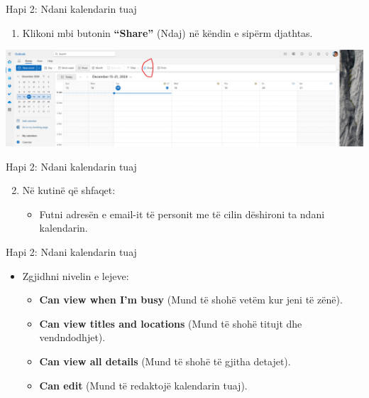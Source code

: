 \documentclass[
  ignorenonframetext,
]{beamer}
\providecommand{\tightlist}{%
  \setlength{\itemsep}{0pt}\setlength{\parskip}{0pt}}
\begin{document}
\begin{frame}{Hapi 2: Ndani kalendarin tuaj}
\label{hapi-2-ndani-kalendarin-tuaj}
\begin{enumerate}
\tightlist
\item
  Klikoni mbi butonin \textbf{``Share''} (Ndaj) në këndin e sipërm
  djathtas.
\end{enumerate}

\includegraphics{./images/outlook28.png}
\end{frame}

\begin{frame}{Hapi 2: Ndani kalendarin tuaj}
\label{hapi-2-ndani-kalendarin-tuaj-1}
\begin{enumerate}
\setcounter{enumi}{1}
\tightlist
\item
  Në kutinë që shfaqet:

  \begin{itemize}
  \tightlist
  \item
    Futni adresën e email-it të personit me të cilin dëshironi ta ndani
    kalendarin.
  \end{itemize}
\end{enumerate}
\end{frame}

\begin{frame}{Hapi 2: Ndani kalendarin tuaj}
\label{hapi-2-ndani-kalendarin-tuaj-2}
\begin{itemize}
\item
  Zgjidhni nivelin e lejeve:

  \begin{itemize}
  \item
    \textbf{Can view when I'm busy} (Mund të shohë vetëm kur jeni të
    zënë).
  \item
    \textbf{Can view titles and locations} (Mund të shohë titujt dhe
    vendndodhjet).
  \item
    \textbf{Can view all details} (Mund të shohë të gjitha detajet).
  \item
    \textbf{Can edit} (Mund të redaktojë kalendarin tuaj).
  \end{itemize}
\end{itemize}
\end{frame}
\end{document}
